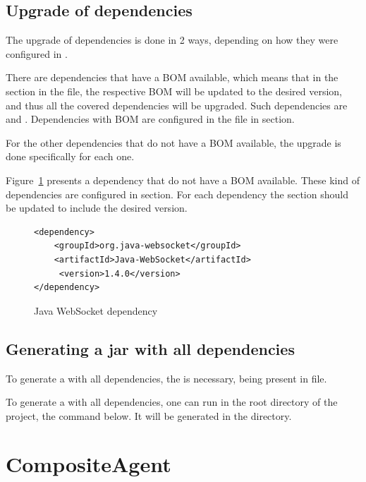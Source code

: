 \documentclass{article}
\begin{document}
\subsection{Upgrade of dependencies}

The upgrade of dependencies is done in 2 ways, depending on how they were configured in .

There are dependencies that have a BOM available, which means that in the  section in the  file, the respective BOM will be updated to the desired version, and thus all the covered dependencies will be upgraded. Such dependencies are  and .
Dependencies with BOM are configured in the  file in  section.


For the other dependencies that do not have a BOM available, the upgrade is done specifically for each one.

Figure~\ref{fig:func:JavaWebSocketDependency:code} presents a dependency that do not have a BOM available. These kind of dependencies are configured in  section. For each dependency the  section should be updated to include the desired version.

\begin{figure}[ht]\centering
\begin{lstlisting}
<dependency>
    <groupId>org.java-websocket</groupId>
    <artifactId>Java-WebSocket</artifactId>
     <version>1.4.0</version>
</dependency>
\end{lstlisting}
\caption{Java WebSocket dependency}\label{fig:func:JavaWebSocketDependency:code}
\end{figure}

\subsection{Generating a jar with all dependencies}

To generate a  with all dependencies, the  is necessary, being present in  file. 

To generate a  with all dependencies, one can run in the root directory of the project, the command below. It will be generated in the  directory.



\clearpage
\section{CompositeAgent}
\end{document}
